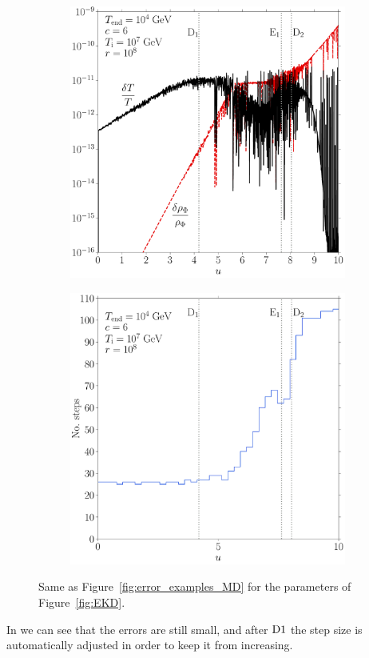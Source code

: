 \documentclass[11pt,a4paper]{article}
\begin{document}
\begin{figure}[t]
	\begin{subfigure}{0.5\textwidth}
		\includegraphics[width=1\textwidth]{EKD_err.pdf}
		\caption{}
		\label{fig:EKD_err}
	\end{subfigure}
	\begin{subfigure}{0.5\textwidth}
		\includegraphics[width=1\textwidth]{EKD_hist.pdf}
		\caption{}
		\label{fig:EKD_hist}
	\end{subfigure}
	\caption{Same as  Figure~\ref{fig:error_examples_MD} for the parameters of Figure~\ref{fig:EKD}.}
	\label{fig:error_examples_KD}
\end{figure}
%
In  we can see that the errors are still small, and after ${\rm D1}{}$ the step size is automatically adjusted in order to keep it from increasing.
\end{document}
